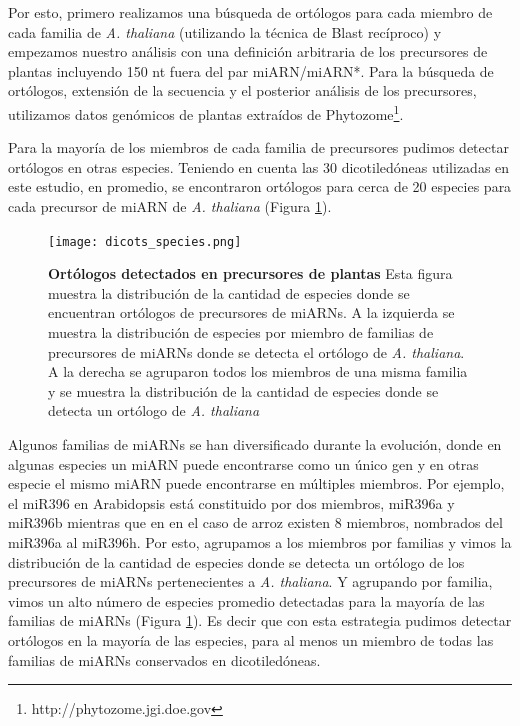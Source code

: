 Por esto, primero realizamos una búsqueda de ortólogos para cada miembro de cada familia de \textit{A. thaliana} (utilizando la técnica de Blast recíproco) y empezamos nuestro análisis con una definición arbitraria de los precursores de plantas incluyendo 150 nt fuera del par miARN/miARN*.
Para la búsqueda de ortólogos, extensión de la secuencia y el posterior análisis de los precursores, utilizamos datos genómicos de plantas extraídos de Phytozome\footnote{http://phytozome.jgi.doe.gov}. 

Para la mayoría de los miembros de cada familia de precursores pudimos detectar ortólogos en otras especies. 
Teniendo en cuenta las 30 dicotiledóneas utilizadas en este estudio, en promedio, se encontraron ortólogos para cerca de 20 especies para cada precursor de miARN de \textit{A. thaliana} (Figura \ref{fig:dicots_species}).

\begin{figure}[htbp!]
    \centering    
    \texttt{[image: dicots\_species.png]}
    \caption[Ortólogos detectados en precursores de plantas]{
    \textbf{Ortólogos detectados en precursores de plantas}
    Esta figura muestra la distribución de la cantidad de especies donde se encuentran ortólogos de precursores de miARNs.
    A la izquierda se muestra la distribución de especies por miembro de familias de precursores de miARNs donde se detecta el ortólogo de \textit{A. thaliana}.
    A la derecha se agruparon todos los miembros de una misma familia y se muestra la distribución de la cantidad de especies donde se detecta un ortólogo de \textit{A. thaliana}
    }
    \label{fig:dicots_species}
\end{figure}

Algunos familias de miARNs se han diversificado durante la evolución, donde en algunas especies un miARN puede encontrarse como un único gen y en otras especie el mismo miARN puede encontrarse en múltiples miembros.
Por ejemplo, el miR396 en Arabidopsis está constituido por dos miembros, miR396a y miR396b mientras que en en el caso de arroz existen 8 miembros, nombrados del miR396a al miR396h.
Por esto, agrupamos a los miembros por familias y vimos la distribución de la cantidad de especies donde se detecta un ortólogo de los precursores de miARNs pertenecientes a \textit{A. thaliana}.
Y agrupando por familia, vimos un alto número de especies promedio detectadas para la mayoría de las familias de miARNs (Figura \ref{fig:dicots_species}).
Es decir que con esta estrategia pudimos detectar ortólogos en la mayoría de las especies, para al menos un miembro de todas las familias de miARNs conservados en dicotiledóneas. 

